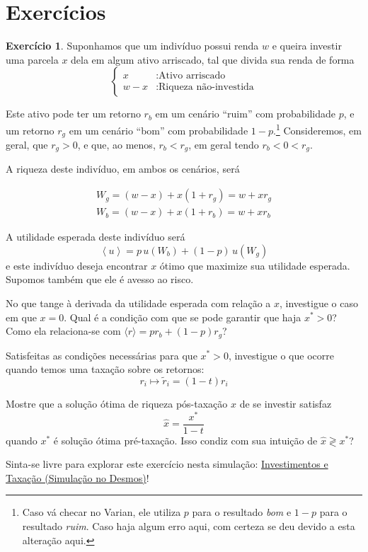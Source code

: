 \documentclass[12pt]{article}
\numberwithin{equation}{section}
\theoremstyle{plain}
\theoremstyle{definition}
\newtheorem{exercise}{Exercício}
\theoremstyle{remark}
\begin{document}
\hypertarget{exercuxedcios}{%
\section{Exercícios}\label{exercuxedcios}}
\begin{exercise}
\parencite[, pp. 233-5]{Varian2014} Suponhamos que um indivíduo possui
renda \(w\) e queira investir uma parcela \(x\) dela em algum ativo
arriscado, tal que divida sua renda de forma
\[
\begin{cases}
x&: \text{Ativo arriscado}\\
w-x&: \text{Riqueza não-investida} 
\end{cases}
\]

Este ativo pode ter um retorno \(r_{b}\) em um cenário ``ruim'' com
probabilidade \(p\), e um retorno \(r_{g}\) em um cenário ``bom'' com
probabilidade \(1-p\).\footnote{Caso vá checar no Varian, ele utiliza
  \(p\) para o resultado \textit{bom} e \(1-p\) para o resultado
  \textit{ruim}. Caso haja algum erro aqui, com certeza se deu devido a
  esta alteração aqui.} Consideremos, em geral, que \(r_{g}> 0\), e que,
ao menos, \(r_{b}<r_{g}\), em geral tendo \(r_{b}<0 < r_{g}\).

A riqueza deste indivíduo, em ambos os cenários, será

\begin{align*}
W_{g} = (w-x) + x (1+r_{g}) = w + x r_{g}\\
W_{b} = (w-x) + x (1+r_{b}) = w + x r_{b}
\end{align*}

A utilidade esperada deste indivíduo será
\[
\left<u\right> = p \,u(W_{b}) + (1-p) \,u(W_{g})
\]
e este indivíduo deseja encontrar \(x\) ótimo que maximize sua utilidade
esperada. Supomos também que ele é avesso ao risco.

No que tange à derivada da utilidade esperada com relação a \(x\),
investigue o caso em que \(x=0\). Qual é a condição com que se pode
garantir que haja \(x^*>0\)? Como ela relaciona-se com
\(\langle r \rangle = p r_{b}+(1-p)r_{g}\)?

Satisfeitas as condições necessárias para que \(x^*>0\), investigue o
que ocorre quando temos uma taxação sobre os retornos:
\[
r_{i} \mapsto \tilde{r}_{i} = (1-t) r_{i}
\]

Mostre que a solução ótima de riqueza pós-taxação \(\hat{x}\) de se
investir satisfaz
\[
\hat{x} = \frac{x^*}{1-t}
\]
quando \(x^*\) é solução ótima pré-taxação. Isso condiz com sua intuição
de \(\hat{x} \gtrless x^*\)?

Sinta-se livre para explorar este exercício nesta simulação:
\href{https://www.desmos.com/calculator/ppkg28wznf}{Investimentos e
Taxação (Simulação no Desmos)}!
\end{exercise}
\end{document}
